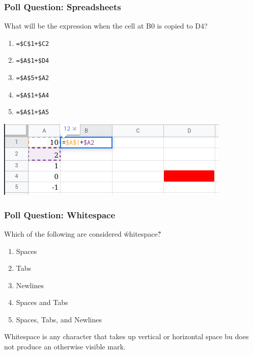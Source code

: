 \documentclass{beamer}
\begin{document}
%
%
%
\begin{frame}[fragile]
  \frametitle{Poll Question: Spreadsheets}
  What will be the expression when the cell at B0 is copied to D4?
  \vfill
  \begin{minipage}{.29\textwidth}
    \begin{enumerate}
      \item \lstinline{=$C$1+$C2}
      \item \lstinline{=$A$1+$D4}
      \item \lstinline{=$A$5+$A2}
      \item \lstinline{=$A$1+$A4}
      \item \lstinline{=$A$1+$A5}
    \end{enumerate}
  \end{minipage}
  \begin{minipage}{.69\textwidth}
    \includegraphics[width=\textwidth]{./imgs/spreadsheet-slide-2.png}
  \end{minipage}
\end{frame}

%
%
%
\begin{frame}[fragile]
  \frametitle{Poll Question: Whitespace}
  Which of the following are considered \'whitespace\'?
  \vfill
  \begin{enumerate}
    \item Spaces
    \item Tabs
    \item Newlines
    \item Spaces and Tabs
    \item Spaces, Tabs, and Newlines
  \end{enumerate}
  \pause
  \vfill
  Whitespace is any character that takes up vertical or horizontal space bu does not produce an otherwise visible mark.
\end{frame}


%
%
%
\end{document}

